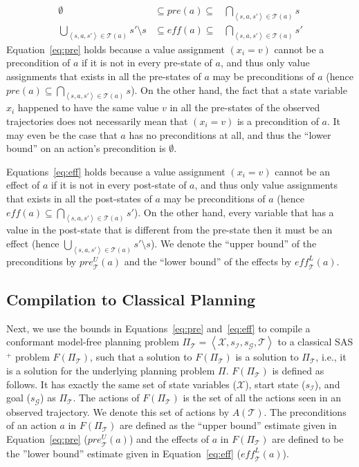 \documentclass{article}
\newcommand{\tuple}[1]{\ensuremath{\left \langle #1 \right \rangle }}
\newcommand{\SAS}{SAS$^+$}
\newcommand{\cmfp}{conformant model-free planning}
\newcommand{\eff}{\textit{eff}}
\newcommand{\pre}{\textit{pre}}
\begin{document}
	\begin{align}
	\emptyset & \subseteq \pre(a) \subseteq & \bigcap_{\tuple{s, a, s'}\in \mathcal{T}(a)} s \label{eq:pre} \\
	\bigcup_{\tuple{s, a, s'}\in \mathcal{T}(a)} s'\setminus s &
	\subseteq \eff(a) \subseteq &
	\bigcap_{\tuple{s, a, s'}\in \mathcal{T}(a)} s'
	\label{eq:eff}
	\end{align}
	Equation~\ref{eq:pre} holds because a value assignment $(x_i=v)$ cannot be a precondition of $a$ if it is not in every pre-state of $a$, and thus only value assignments that 
	exists in all the pre-states of $a$ may be preconditions of $a$ (hence $\pre(a)\subseteq \bigcap_{\tuple{s, a, s'}\in \mathcal{T}(a)} s$).     On the other hand, the fact that a state variable $x_i$ happened to have the same value $v$ in all the pre-states of the observed trajectories does not necessarily mean that $(x_i=v)$ is a precondition of $a$. It may even be the case that $a$ has no preconditions at all, and thus the ``lower bound'' on an action's precondition is $\emptyset$. 
	
	Equations~\ref{eq:eff} holds because a value assignment $(x_i=v)$ cannot be an effect of $a$ if it is not in every post-state of $a$, and thus only value assignments that 
	exists in all the post-states of $a$ may be preconditions of $a$ (hence $\eff(a)\subseteq \bigcap_{\tuple{s, a, s'}\in \mathcal{T}(a)} s'$). On the other hand, every variable that has a value in the post-state that is different from the pre-state then it must be an effect (hence $\bigcup_{\tuple{s, a, s'}\in \mathcal{T}(a)} s'\setminus s$).
	We denote the ``upper bound'' of the preconditions by $\pre_\mathcal{T}^U(a)$ 
	and the ``lower bound'' of the effects by $\eff_\mathcal{T}^L(a)$. 
	
	
	
	\subsection{Compilation to Classical Planning} 
	Next, we use the bounds in Equations~\ref{eq:pre} and~\ref{eq:eff} to compile a \cmfp{} problem 
	$\Pi_\mathcal{T}=\tuple{\mathcal{X},s_\mathcal{I}, s_\mathcal{G}, \mathcal{T}}$ 
	to a classical \SAS{} problem $F(\Pi_\mathcal{T})$, such that a solution to $F(\Pi_\mathcal{T})$ 
	is a solution to $\Pi_\mathcal{T}$, i.e., it is a solution for the underlying planning problem $\Pi$. 
	$F(\Pi_\mathcal{T})$ is defined as follows. It has exactly the same set of 
	state variables ($\mathcal{X}$), start state ($s_\mathcal{I}$), and goal ($s_\mathcal{G}$) as $\Pi_\mathcal{T}$. The actions of $F(\Pi_\mathcal{T})$ is the set of all the actions seen in an observed trajectory. We denote this set of actions by $A(\mathcal{T})$. 
	The preconditions of an action $a$ in  $F(\Pi_\mathcal{T})$ 
	are defined as the ``upper bound'' estimate given in Equation~\ref{eq:pre} ($\pre_\mathcal{T}^U(a)$) and the effects of $a$ in  $F(\Pi_\mathcal{T})$  
	are defined to be the ''lower bound'' estimate given in 
	Equation~\ref{eq:eff} ($\eff_\mathcal{T}^L(a)$).
	
\end{document}
